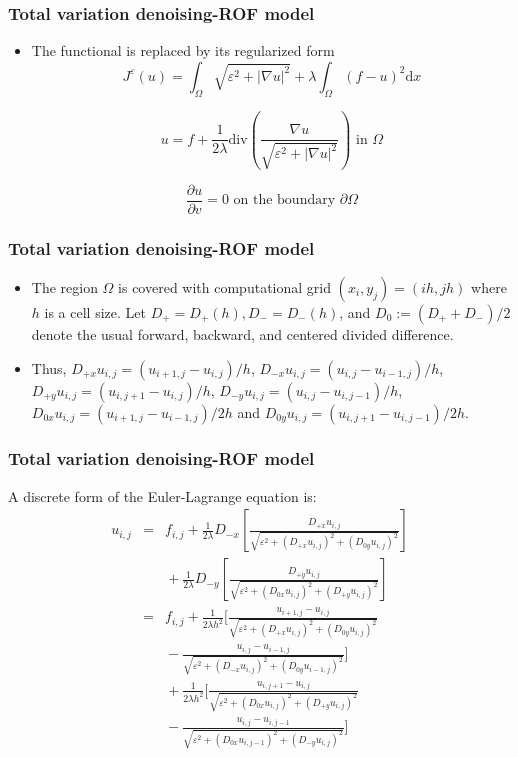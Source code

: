 \documentclass[notheorems,mathserif,table,compress]{beamer}  %
\begin{document}
%
\begin{frame}
\frametitle{Total variation denoising-ROF model}
\begin{itemize}
\item The functional is replaced by its regularized form
\newcommand{\ud}{\mathrm{d}}
\begin{displaymath}
J^\varepsilon(u)=\int_{\Omega}\sqrt{\varepsilon^2+|\nabla u|^2}+\lambda \int_{\Omega}(f-u)^2\ud x
\end{displaymath}

\begin{displaymath}
u=f+\frac{1}{2\lambda}\textrm{div}(\frac{\nabla u}{\sqrt{\varepsilon^2+|\nabla u|^2}}) \textrm{ in $\Omega$} 
\end{displaymath}

\begin{displaymath}
\frac{\partial u}{\partial v}=0 \textrm{ on the boundary $\partial{\Omega}$}
\end{displaymath}
\end{itemize}
\end{frame}

%
\begin{frame}
\frametitle{Total variation denoising-ROF model}
\begin{itemize}
\item The region $\Omega$ is covered with computational grid $(x_i,y_j )=(ih,jh)$ where $h$ is a cell size. Let $D_+=D_+(h), D_−=D_−(h)$, and $D_0:=(D_++D_−)/2$ denote the usual forward, backward, and centered divided difference.
\item Thus, $D_{+x}u_{i,j}=(u_{i+1,j}−u_{i,j})/h$, $D_{−x}u_{i,j}=(u_{i,j}−u_{i−1,j} )/h$, $D_{+y}u_{i,j}=(u_{i,j+1}−u_{i,j})/h$, $D_{−y}u_{i,j}=(u_{i,j}− u_{i,j−1})/h$, $D_{0x}u_{i,j}=(u_{i+1,j}−u_{i−1,j})/2h$ and $D_{0y}u_{i,j}=
(u_{i,j+1}−u_{i,j−1})/2h$. 
\end{itemize}
\end{frame}

%
\begin{frame}
\frametitle{Total variation denoising-ROF model}
A discrete form of the Euler-Lagrange equation is:
\begin{eqnarray*}
u_{i,j}&=&f_{i,j}+\frac{1}{2\lambda}D_{-x}[\frac{D_{+x}u_{i,j}}{\sqrt{\varepsilon^2+(D_{+x}u_{i,j})^2+(D_{0y}u_{i,j})^2}}] {}\nonumber\\
&& {}+\frac{1}{2\lambda}D_{-y}[\frac{D_{+y}u_{i,j}}{\sqrt{\varepsilon^2+(D_{0x}u_{i,j})^2+(D_{+y}u_{i,j})^2}}]\\
&=&f_{i,j}+\frac{1}{2\lambda h^2}[\frac{u_{i+1,j}−u_{i,j}}{\sqrt{\varepsilon^2+(D_{+x}u_{i,j})^2+(D_{0y}u_{i,j})^2}} {}\nonumber\\
&& {}-\frac{u_{i,j}−u_{i-1,j}}{\sqrt{\varepsilon^2+(D_{-x}u_{i,j})^2+(D_{0y}u_{i-1,j})^2}}] {}\nonumber\\
&& {}+\frac{1}{2\lambda h^2}[\frac{u_{i,j+1}−u_{i,j}}{\sqrt{\varepsilon^2+(D_{0x}u_{i,j})^2+(D_{+y}u_{i,j})^2}} {}\nonumber\\
&& {}-\frac{u_{i,j}−u_{i,j-1}}{\sqrt{\varepsilon^2+(D_{0x}u_{i,j-1})^2+(D_{-y}u_{i,j})^2}}]
\end{eqnarray*}

\end{frame}
\end{document}
